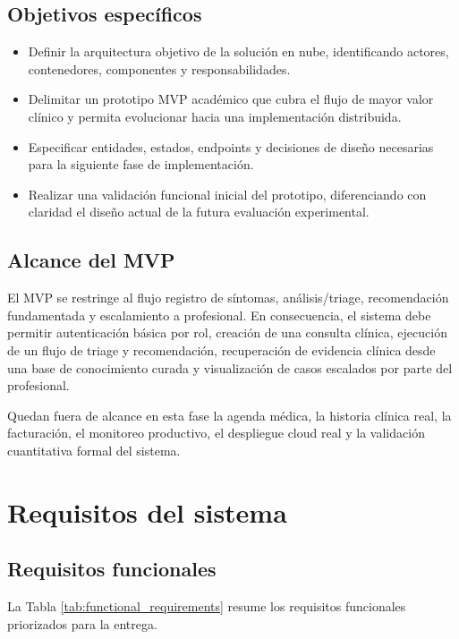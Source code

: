 \documentclass[12pt]{article}
\begin{document}
\subsection{Objetivos específicos}

\begin{itemize}[leftmargin=*]
  \item Definir la arquitectura objetivo de la solución en nube, identificando actores, contenedores, componentes y responsabilidades.
  \item Delimitar un prototipo MVP académico que cubra el flujo de mayor valor clínico y permita evolucionar hacia una implementación distribuida.
  \item Especificar entidades, estados, endpoints y decisiones de diseño necesarias para la siguiente fase de implementación.
  \item Realizar una validación funcional inicial del prototipo, diferenciando con claridad el diseño actual de la futura evaluación experimental.
\end{itemize}

\subsection{Alcance del MVP}

El MVP se restringe al flujo registro de síntomas, análisis/triage, recomendación fundamentada y escalamiento a profesional. En consecuencia, el sistema debe permitir autenticación básica por rol, creación de una consulta clínica, ejecución de un flujo de triage y recomendación, recuperación de evidencia clínica desde una base de conocimiento curada y visualización de casos escalados por parte del profesional.

Quedan fuera de alcance en esta fase la agenda médica, la historia clínica real, la facturación, el monitoreo productivo, el despliegue cloud real y la validación cuantitativa formal del sistema.

\section{Requisitos del sistema}

\subsection{Requisitos funcionales}

La Tabla \ref{tab:functional_requirements} resume los requisitos funcionales priorizados para la entrega.
\end{document}
